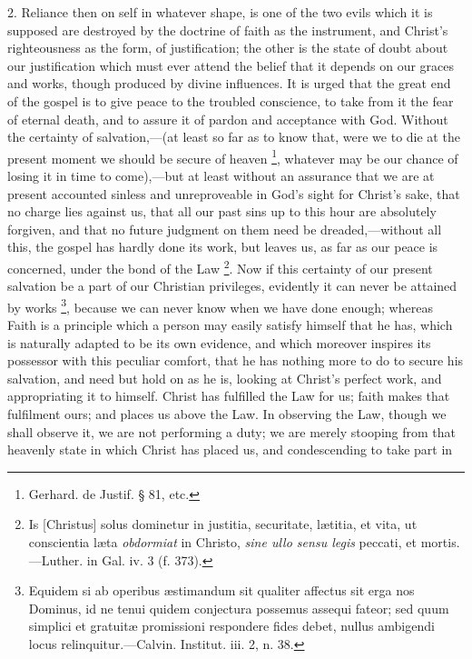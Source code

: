 2. Reliance then on self in whatever shape, is one of the two evils
which it is supposed are destroyed by the doctrine of faith as the
instrument, and Christ's righteousness as the form, of justification;
the other is the state of doubt about our justification which must
ever attend the belief that it depends on our graces and works, though
produced by divine influences. It is urged that the great end of the
gospel is to give peace to the troubled conscience, to take from it
the fear of eternal death, and to assure it of pardon and acceptance
with God. Without the certainty of salvation,—(at least so far as to
know that, were we to die at the present moment we should be
secure of heaven \footnote{Gerhard. de
Justif. § 81, etc.}, whatever may be our chance of losing it in
time to come),—but at least without an assurance that we are at
present accounted sinless and unreproveable in God's sight for
Christ's sake, that no charge lies against us, that all our past sins
up to this hour are absolutely forgiven, and that no future judgment
on them need be dreaded,—without all this, the gospel has hardly
done its work, but leaves us, as far as our peace is concerned, under
the bond of the Law \footnote{Is [Christus]
solus dominetur in justitia, securitate, lætitia, et vita, ut
conscientia læta \emph{obdormiat} in Christo, \emph{sine ullo sensu
legis} peccati, et mortis.—Luther. in Gal. iv. 3 (f. 373).}. Now if this certainty of our present
salvation be a part of our Christian privileges, evidently it can
never be attained by works \footnote{Equidem si ab
operibus æstimandum sit qualiter affectus sit erga nos Dominus, id ne
tenui quidem conjectura possemus assequi fateor; sed quum simplici et
gratuitæ promissioni respondere fides debet, nullus ambigendi locus
relinquitur.—Calvin. Institut. iii. 2, n. 38.}, because we can never know when
we have done enough; whereas Faith is a principle which a person may
easily satisfy himself that he has, which is naturally adapted to be
its own evidence, and which moreover inspires its possessor with this
peculiar comfort, that he has nothing more to do to secure his
salvation, and need but hold on as he is, looking at Christ's perfect
work, and appropriating it to himself. Christ has fulfilled the Law
for us; faith makes that fulfilment ours; and places us above the Law.
In observing the Law, though we shall observe it, we are not
performing a duty; we are merely stooping from that heavenly state in
which Christ has placed us, and condescending to take part in
